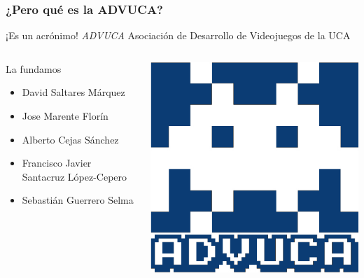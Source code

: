 \documentclass{beamer}
\begin{document}
\begin{frame}
    \frametitle{¿Pero qué es la ADVUCA?}
    
    \begin{center}
        \begin{alertblock}{¡Es un acrónimo!}
            \emph{ADVUCA} \rightarrow Asociación de Desarrollo de Videojuegos de la UCA
        \end{alertblock}        
    \end{center}
    
    \begin{columns}[c]
		\column{150pt}
		\begin{block}{La fundamos}
            \begin{itemize}
                \item David Saltares Márquez
                \item Jose Marente Florín
                \item Alberto Cejas Sánchez
                \item Francisco Javier Santacruz López-Cepero
                \item Sebastián Guerrero Selma
            \end{itemize}            
        \end{block}        
		\column{150pt}
		\begin{center}
			\includegraphics[scale=0.2]{img/advuca.png}
		\end{center}
	\end{columns} 

\end{frame}
\end{document}
